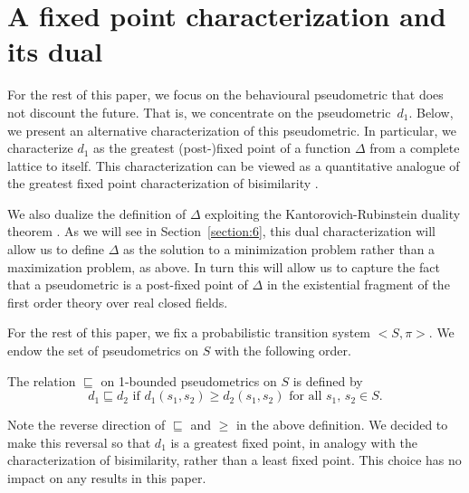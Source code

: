 \documentclass{LMCS}
\begin{document}
\section{A fixed point characterization and its dual}
\label{section:4}

For the rest of this paper, we focus on the behavioural pseudometric
that does not discount the future.  That is, we concentrate on the
pseudometric~$d_1$.  Below, we present an alternative characterization
of this pseudometric.  In particular, we characterize $d_1$ as the
greatest (post-)fixed point of a function $\Delta$ from a complete
lattice to itself.  This characterization can be viewed as a
quantitative analogue of the greatest fixed point characterization of
bisimilarity \cite{P81:tcs}.

We also dualize the definition of $\Delta$ exploiting the Kantorovich-Rubinstein
duality theorem \cite{KR58:vestni}.  As we will see in Section~\ref{section:6},
this dual characterization will allow us to define $\Delta$ as the solution to a minimization
problem rather than a maximization problem, as above.  In turn this will allow us to capture
the fact that a pseudometric is a post-fixed point of $\Delta$ in the existential fragment
of the first order theory over real closed fields.

For the rest of this paper, we fix a probabilistic transition
system $<S, \pi>$.  We endow the set of pseudometrics on $S$ with
the following order.

\begin{defi}
The relation $\sqsubseteq$ on 1-bounded pseudometrics on $S$ is defined by
\begin{displaymath}
d_1 \sqsubseteq d_2 \mbox{ if } d_1(s_1, s_2) \geq d_2(s_1, s_2)
\mbox{ for all $s_1$, $s_2 \in S$}.
\end{displaymath}
\end{defi}

Note the reverse direction of $\sqsubseteq$ and $\geq$ in the above
definition.  We decided to make this reversal so that $d_1$ is a
greatest fixed point, in analogy with the characterization of bisimilarity,
rather than a least fixed point.  This choice has no impact on any
results in this paper.
\end{document}
